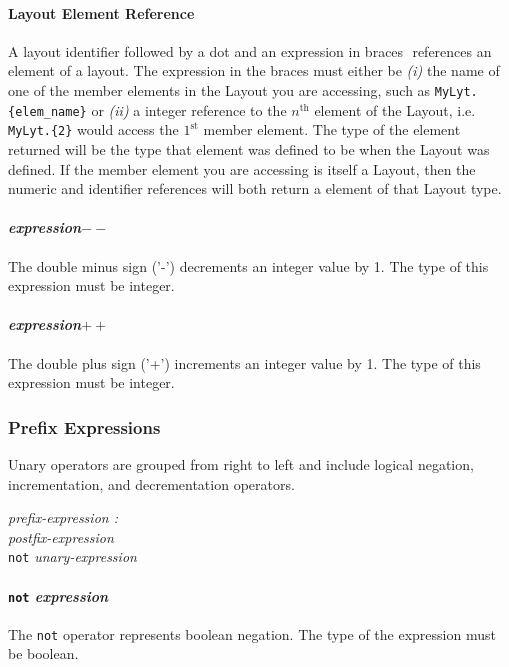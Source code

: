 \documentclass{article}
\begin{document}
\paragraph{Layout Element Reference}
\label{sec:layoutref}
A layout identifier followed by a dot and an expression in braces ${ }$ references an element of a layout. The expression in the braces must either be \emph{(i)} the name of one of the member elements in the Layout you are accessing, such as \lstinline!MyLyt.{elem_name}! or \emph{(ii)} a integer reference to the $n^\mathrm{th}$ element of the Layout, i.e. \lstinline!MyLyt.{2}! would access the $1^\mathrm{st}$ member element. The type of the element returned will be the type that element was defined to be when the Layout was defined. If the member element you are accessing is itself a Layout, then the numeric and identifier references will both return a element of that Layout type. 

\paragraph{\emph{expression}$--$}
The double minus sign ('-') decrements an integer value by 1. The type of this expression must be integer.
\paragraph{\emph{expression}$++$}
The double plus sign ('+') increments an integer value by 1. The type of this expression must be integer.

\subsubsection{Prefix Expressions}
Unary operators are grouped from right to left and include logical negation, incrementation, and decrementation operators.
\begin{tabbing}
	\= \emph{pre}\=\emph{fix-expression :} \\
		\> \> \emph{postfix-expression} \\
		\>\> \texttt{not} \emph{unary-expression}\\
\end{tabbing}

\paragraph{\texttt{not} \emph{expression}}
The \texttt{not} operator represents boolean negation. The type of the expression must be boolean.
\end{document}
